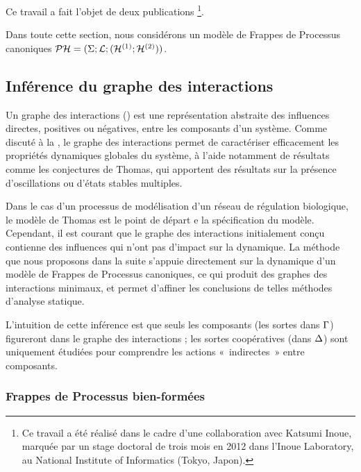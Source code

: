 \myskip

Ce travail a fait l'objet de deux publications \cite*{FPIMR12-CMSB,FPIMR12-LDSSB}%
\footnote{Ce travail a été réalisé dans le cadre d'une collaboration avec Katsumi Inoue,
marquée par un stage doctoral de trois mois en 2012 dans l'Inoue Laboratory,
au National Institute of Informatics (Tokyo, Japon).}.

\myskip

Dans toute cette section, nous considérons un modèle de Frappes de Processus canoniques
$\mathcal{PH} = (\Sigma; \mathcal{L}; (\mathcal{H}^{(1)}; \mathcal{H}^{(2)}))$.

\subsection{Inférence du graphe des interactions}

Un graphe des interactions () est une représentation abstraite des
influences directes, positives ou négatives, entre les composants d'un système.
Comme discuté à la , le graphe des interactions permet
de caractériser efficacement les propriétés dynamiques globales du système,
à l'aide notamment de résultats comme les conjectures de Thomas,
qui apportent des résultats sur la présence d'oscillations ou d'états stables multiples.

Dans le cas d'un processus de modélisation d'un réseau de régulation biologique, le modèle
de Thomas est le point de départ e la spécification du modèle.
Cependant, il est courant que le graphe des interactions initialement conçu contienne des
influences qui n'ont pas d'impact sur la dynamique.
La méthode que nous proposons dans la suite s'appuie directement sur la dynamique d'un modèle
de Frappes de Processus canoniques, ce qui produit des graphes des interactions minimaux,
et permet d'affiner les conclusions de telles méthodes d'analyse statique.

L'intuition de cette inférence est que seuls les composants (les sortes dans $\mathrm{\Gamma}$)
figureront dans le graphe des interactions ;
les sortes coopératives (dans $\Delta$) sont uniquement étudiées pour comprendre les actions
«~indirectes~» entre composants.



\subsubsection{Frappes de Processus bien-formées}

